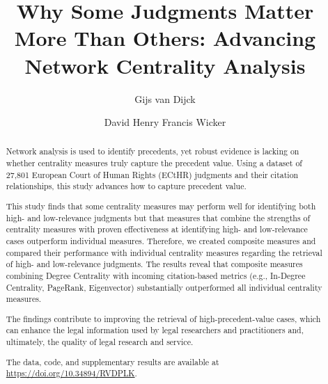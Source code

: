 \documentclass[sigconf]{acmart}
\begin{document}
\title{Why Some Judgments Matter More Than Others: Advancing Network Centrality Analysis}

%

\author{Gijs van Dijck}

\author{David Henry Francis Wicker}



\renewcommand{\shortauthors}{Van Dijck \& Wicker}

\begin{abstract}

Network analysis is used to identify precedents, yet robust evidence is lacking on whether centrality measures truly capture the precedent value. Using a dataset of 27,801 European Court of Human Rights (ECtHR) judgments and their citation relationships, this study advances how to capture precedent value.

This study finds that some centrality measures may perform well for identifying both high- and low-relevance judgments but that measures that combine the strengths of centrality measures with proven effectiveness at identifying high- and low-relevance cases outperform individual measures. Therefore, we created composite measures and compared their performance with individual centrality measures regarding the retrieval of high- and low-relevance judgments. The results reveal that composite measures combining Degree Centrality with incoming citation-based metrics (e.g., In-Degree Centrality, PageRank, Eigenvector) substantially outperformed all individual centrality measures.

The findings contribute to improving the retrieval of high-precedent-value cases, which can enhance the legal information used by legal researchers and practitioners and, ultimately, the quality of legal research and service.

The data, code, and supplementary results are available at \url{https://doi.org/10.34894/RVDPLK}.

\end{abstract}
\end{document}
